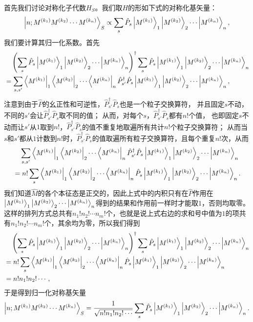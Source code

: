 \documentclass[hyperref, UTF8, a4paper]{ctexart}
\begin{document}
首先我们讨论对称化子代数$H_S$。我们取$H$的形如下式的对称化基矢量：
\[
    \ket{n; M^{(k_1)} M^{(k_2)} \cdots M^{(k_n)}}_S \propto \sum_s \hat{P}_s \ket{M^{(k_1)}}_1 \ket{M^{(k_2)}}_2 \cdots \ket{M^{(k_n)}}_n,
\]
我们要计算其归一化系数。首先
\[
    \begin{aligned}
        &\quad \left(\sum_s \hat{P}_s \ket{M^{(k_1)}}_1 \ket{M^{(k_2)}}_2 \cdots \ket{M^{(k_n)}}_n\right)^\dagger \sum_s \hat{P}_s \ket{M^{(k_1)}}_1 \ket{M^{(k_2)}}_2 \cdots \ket{M^{(k_n)}}_n \\
        &= \sum_{s, s'} \bra{M^{(k_1)}}_1 \bra{M^{(k_2)}}_2 \cdots \bra{M^{(k_n)}}_n \hat{P}_{s'}^\dagger \hat{P}_s \ket{M^{(k_1)}}_1 \ket{M^{(k_2)}}_2 \cdots \ket{M^{(k_n)}}_n, 
    \end{aligned}
\]
注意到由于$\hat{P}$的幺正性和可逆性，$\hat{P}_{s'}^\dagger \hat{P}_s$也是一个粒子交换算符，
并且固定$s$不动，不同的$s'$会让$\hat{P}_{s'}^\dagger \hat{P}_s$取不同的值；
从而，对每个$s$，$\hat{P}_{s'}^\dagger \hat{P}_s$都有$n!$个值，
也即固定$s$不动而让$s'$从$1$取到$n!$，$\hat{P}_{s'}^\dagger \hat{P}_s$的值不重复地取遍所有共计$n!$个粒子交换算符；
从而当$s$和$s'$都从$1$计数到$n!$时，$\hat{P}_{s'}^\dagger \hat{P}_s$的值取遍所有粒子交换算符，且每个重复$n!$次，从而
\[
    \begin{aligned}
        &\quad \sum_{s, s'} \bra{M^{(k_1)}}_1 \bra{M^{(k_2)}}_2 \cdots \bra{M^{(k_n)}}_n \hat{P}_{s'}^\dagger \hat{P}_s \ket{M^{(k_1)}}_1 \ket{M^{(k_2)}}_2 \cdots \ket{M^{(k_n)}}_n \\
        &= n! \sum_s \bra{M^{(k_1)}}_1 \bra{M^{(k_2)}}_2 \cdots \bra{M^{(k_n)}}_n \hat{P}_s \ket{M^{(k_1)}}_1 \ket{M^{(k_2)}}_2 \cdots \ket{M^{(k_n)}}_n.
    \end{aligned}
\]
我们知道$\hat{M}$的各个本征态是正交的，因此上式中的内积只有在$\hat{P}$作用在$\ket{M^{(k_1)}}_1 \ket{M^{(k_2)}}_2 \cdots \ket{M^{(k_n)}}_n$得到的结果和作用前一样时才能取$1$，否则均取零。这样的排列方式总共有$n_1!n_2!\cdots n_m!$个，也就是说上式右边的求和号中值为$1$的项共有$n_1!n_2!\cdots n_m!$个，其余均为零，所以我们得到
\[
    \begin{aligned}
        &\quad \left(\sum_s \hat{P}_s \ket{M^{(k_1)}}_1 \ket{M^{(k_2)}}_2 \cdots \ket{M^{(k_n)}}_n\right)^\dagger \sum_s \hat{P}_s \ket{M^{(k_1)}}_1 \ket{M^{(k_2)}}_2 \cdots \ket{M^{(k_n)}}_n \\
        &= n! \sum_s \bra{M^{(k_1)}}_1 \bra{M^{(k_2)}}_2 \cdots \bra{M^{(k_n)}}_n \hat{P}_s \ket{M^{(k_1)}}_1 \ket{M^{(k_2)}}_2 \cdots \ket{M^{(k_n)}}_n \\
        &= n! n_1 ! n_2! \cdots ,
    \end{aligned}
\]
于是得到归一化对称基矢量
\begin{equation}
    \ket{n; M^{(k_1)} M^{(k_2)} \cdots M^{(k_n)}}_S = \frac{1}{\sqrt{n! n_1 ! n_2! \cdots}} \sum_s \hat{P}_s \ket{M^{(k_1)}}_1 \ket{M^{(k_2)}}_2 \cdots \ket{M^{(k_n)}}_n.
    \label{eq:sym-basis}
\end{equation}
\end{document}
